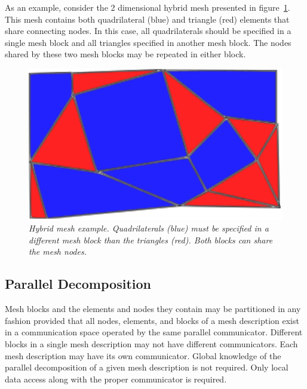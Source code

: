 \documentclass[letterpaper,12pt]{article}
\begin{document}
As an example, consider the 2 dimensional hybrid mesh presented in
figure~\ref{fig:hybrid_mesh}. This mesh contains both quadrilateral
(blue) and triangle (red) elements that share connecting nodes. In
this case, all quadrilaterals should be specified in a single mesh
block and all triangles specified in another mesh block. The nodes
shared by these two mesh blocks may be repeated in either block.

\begin{figure}[htpb!]
  \centering
  \includegraphics[width=5in]{hybrid_mesh.eps}
  \caption{\sl Hybrid mesh example. Quadrilaterals (blue) must be
    specified in a different mesh block than the triangles (red). Both
    blocks can share the mesh nodes.}
  \label{fig:hybrid_mesh}
\end{figure}

\subsection{Parallel Decomposition}\label{subsec:decomp}
Mesh blocks and the elements and nodes they contain may be partitioned
in any fashion provided that all nodes, elements, and blocks of a mesh
description exist in a communication space operated by the same
parallel communicator. Different blocks in a single mesh description
may not have different communicators. Each mesh description may have
its own communicator. Global knowledge of the parallel decomposition
of a given mesh description is not required. Only local data access
along with the proper communicator is required.

\clearpage

\end{document}
